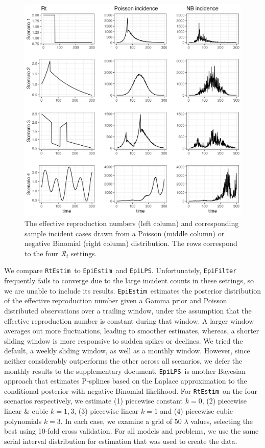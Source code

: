 \documentclass[10pt,letterpaper]{article}
\def\RtEstim{\texttt{RtEstim}}
\def\EpiEstim{\texttt{EpiEstim}}
\def\EpiLPS{\texttt{EpiLPS}}
\def\calR{\mathcal{R}}
\begin{document}
\begin{figure}[!ht]
  \centering
  \includegraphics[width=.8\textwidth]{fig/plot_samples.png}
  \caption{The effective reproduction numbers (left column) and corresponding
  sample incident cases drawn from a  Poisson (middle column) or negative
  Binomial (right column) distribution. The rows correspond to the four
  $\calR_t$ settings.} 
  \label{fig:samples}
\end{figure}

We compare \RtEstim\ to \EpiEstim\ and \EpiLPS. Unfortunately,
\texttt{EpiFilter} frequently fails to converge due to the large incident counts
in these settings, so we are unable to include its results. \EpiEstim\ estimates
the posterior distribution of the effective reproduction number given a Gamma
prior and Poisson distributed observations
over a trailing window, under the assumption that the effective reproduction number is
constant during that window. A larger window averages out more
fluctuations,
leading to smoother estimates, whereas, a shorter sliding window is more
responsive to sudden spikes or declines. We tried the default, a weekly sliding
window, as well as a monthly window. However, since neither considerably
outperforms the other across all scenarios, we defer the monthly results to the
supplementary document. \EpiLPS\ is another Bayesian approach that estimates P-splines 
based on the Laplace approximation to the conditional posterior with negative
Binomial likelihood. For \RtEstim\ on the four scenarios respectively, we
estimate (1) piecewise constant $k=0$, (2) piecewise linear \& cubic $k=1,3$,
(3) piecewise linear $k=1$ and (4) piecewise cubic polynomials $k=3$. In each
case, we examine a grid of 50 $\lambda$ values, selecting the best using 10-fold
cross validation. For all models and problems, we use the same serial interval
distribution for estimation that was used to create the data. 
\end{document}
